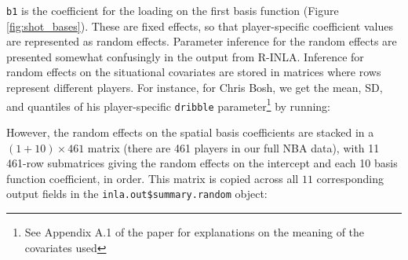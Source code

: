 \documentclass{article}\usepackage[]{graphicx}\usepackage[]{color}
\makeatletter
\newcommand{\hlnum}[1]{\textcolor[rgb]{0.686,0.059,0.569}{#1}}%
\newcommand{\hlstr}[1]{\textcolor[rgb]{0.192,0.494,0.8}{#1}}%
\newcommand{\hlopt}[1]{\textcolor[rgb]{0,0,0}{#1}}%
\newcommand{\hlstd}[1]{\textcolor[rgb]{0.345,0.345,0.345}{#1}}%
\newcommand{\hlkwb}[1]{\textcolor[rgb]{0.69,0.353,0.396}{#1}}%
\newcommand{\hlkwd}[1]{\textcolor[rgb]{0.737,0.353,0.396}{\textbf{#1}}}%
\newenvironment{kframe}{%
 \def\at@end@of@kframe{}%
 \ifinner\ifhmode%
  \def\at@end@of@kframe{\end{minipage}}%
  \begin{minipage}{\columnwidth}%
 \fi\fi%
 \def\FrameCommand##1{\hskip\@totalleftmargin \hskip-\fboxsep
 \colorbox{shadecolor}{##1}\hskip-\fboxsep
     \hskip-\linewidth \hskip-\@totalleftmargin \hskip\columnwidth}%
 \MakeFramed {\advance\hsize-\width
   \@totalleftmargin\z@ \linewidth\hsize
   \@setminipage}}%
 {\par\unskip\endMakeFramed%
 \at@end@of@kframe}
\makeatother
\begin{document}
\texttt{b1} is the coefficient for the loading on the first basis function (Figure \ref{fig:shot_bases}). These are fixed effects, so that player-specific coefficient values are represented as random effects. Parameter inference for the random effects are presented somewhat confusingly in the output from R-INLA. Inference for random effects on the situational covariates are stored in matrices where rows represent different players. For instance, for Chris Bosh, we get the mean, SD, and quantiles of his player-specific \texttt{dribble} parameter\footnote{See Appendix A.1 of the paper for explanations on the meaning of the covariates used} by running:


However, the random effects on the spatial basis coefficients are stacked in a $(1 + 10) \times 461$ matrix (there are 461 players in our full NBA data), with 11 461-row submatrices giving the random effects on the intercept and each 10 basis function coefficient, in order. This matrix is copied across all $11$ corresponding output fields in the \texttt{inla.out\$summary.random} object:
\end{document}
